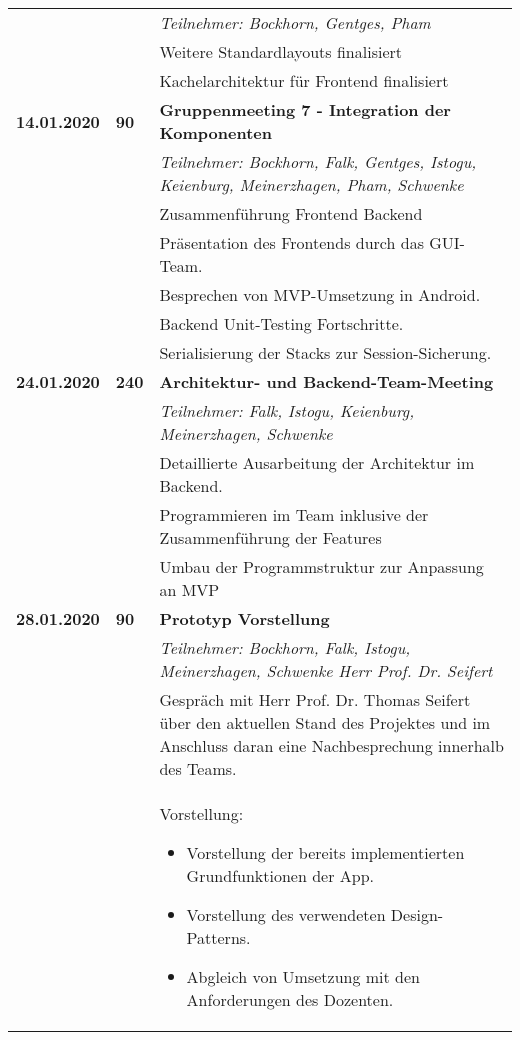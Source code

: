 {{\begin{longtable}{|l|l|p{11cm}|}
			\\ & &
			\small{\textit{Teilnehmer: Bockhorn, Gentges, Pham}}
			\\ & &
			Weitere Standardlayouts finalisiert
			\\ & &
			Kachelarchitektur für Frontend finalisiert			
	\\ \hline
		\textbf{14.01.2020} 
			& \textbf{\hfill90} & \textbf{Gruppenmeeting 7 - Integration der Komponenten}
			\\ & &
			\small{\textit{Teilnehmer: Bockhorn, Falk, Gentges, Istogu, Keienburg, Meinerzhagen, Pham, Schwenke}}
			\\ & &
			Zusammenführung Frontend Backend
			\\ & &
			Präsentation des Frontends durch das GUI-Team.
			\\ & &
			Besprechen von MVP-Umsetzung in Android.
			\\ & &
			Backend Unit-Testing Fortschritte.
			\\ & &
			Serialisierung der Stacks zur Session-Sicherung.
	\\ \hline
		\textbf{24.01.2020} & 
			\textbf{\hfill240} & \textbf{Architektur- und Backend-Team-Meeting}
			\\ & &
			\small{\textit{Teilnehmer: Falk, Istogu, Keienburg, Meinerzhagen, Schwenke}}
			\\ & &
			Detaillierte Ausarbeitung der Architektur im Backend.
			\\ & &
			Programmieren im Team inklusive der Zusammenführung der Features
			\\ & &
			Umbau der Programmstruktur zur Anpassung an MVP
	\\ \hline
		\textbf{28.01.2020} 
			& \textbf{\hfill90} & \textbf{Prototyp Vorstellung}
			\\ & &
			\small{\textit{Teilnehmer: Bockhorn, Falk, Istogu, Meinerzhagen, Schwenke Herr Prof. Dr. Seifert}}
			\\ & &
			Gespräch mit Herr Prof. Dr. Thomas Seifert über den aktuellen Stand des Projektes und im Anschluss daran eine Nachbesprechung innerhalb des Teams.
			\\ & &
			Vorstellung:
			\begin{itemize}\renewcommand\labelitemi{--}
				\item Vorstellung der bereits implementierten Grundfunktionen der App.
				\item Vorstellung des verwendeten Design-Patterns.
				\item Abgleich von Umsetzung mit den Anforderungen des Dozenten.

\end{itemize}
\end{longtable}}}
